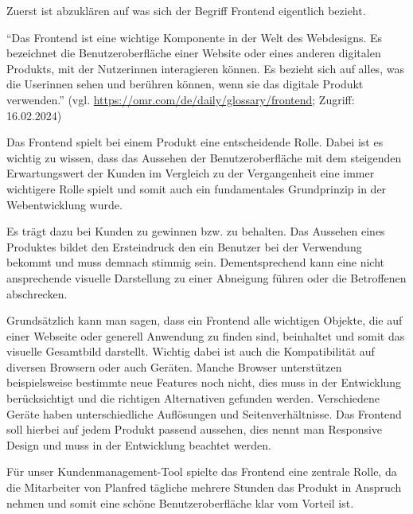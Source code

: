 Zuerst ist abzuklären auf was sich der Begriff Frontend eigentlich bezieht.

“Das Frontend ist eine wichtige Komponente in der Welt des Webdesigns. Es bezeichnet die Benutzeroberfläche einer Website oder eines anderen digitalen Produkts, mit der Nutzerinnen interagieren können. Es bezieht sich auf alles, was die Userinnen sehen und berühren können, wenn sie das digitale Produkt verwenden.”
\newline
(vgl. \url{https://omr.com/de/daily/glossary/frontend}; Zugriff: 16.02.2024)

Das Frontend spielt bei einem Produkt eine entscheidende Rolle. Dabei ist es wichtig zu wissen, dass das Aussehen der Benutzeroberfläche mit dem steigenden Erwartungswert der Kunden im Vergleich zu der Vergangenheit eine immer wichtigere Rolle spielt und somit auch ein fundamentales Grundprinzip in der Webentwicklung wurde. 

Es trägt dazu bei Kunden zu gewinnen bzw. zu behalten. Das Aussehen eines Produktes bildet den Ersteindruck den ein Benutzer bei der Verwendung bekommt und muss demnach stimmig sein. Dementsprechend kann eine nicht ansprechende visuelle Darstellung zu einer Abneigung führen oder die Betroffenen abschrecken. 

Grundsätzlich kann man sagen, dass ein Frontend alle wichtigen Objekte, die auf einer Webseite oder generell Anwendung zu finden sind, beinhaltet und somit das visuelle Gesamtbild darstellt. Wichtig dabei ist auch die Kompatibilität auf diversen Browsern oder auch Geräten. Manche Browser unterstützen beispielsweise bestimmte neue Features noch nicht, dies muss in der Entwicklung berücksichtigt und die richtigen Alternativen gefunden werden. Verschiedene Geräte haben unterschiedliche Auflösungen und Seitenverhältnisse. Das Frontend soll hierbei auf jedem Produkt passend aussehen, dies nennt man Responsive Design und muss in der Entwicklung beachtet werden.

Für unser Kundenmanagement-Tool spielte das Frontend eine zentrale Rolle, da die Mitarbeiter von Planfred tägliche mehrere Stunden das Produkt in Anspruch nehmen und somit eine schöne Benutzeroberfläche klar vom Vorteil ist.
\cite{frontend_grundlagen}

